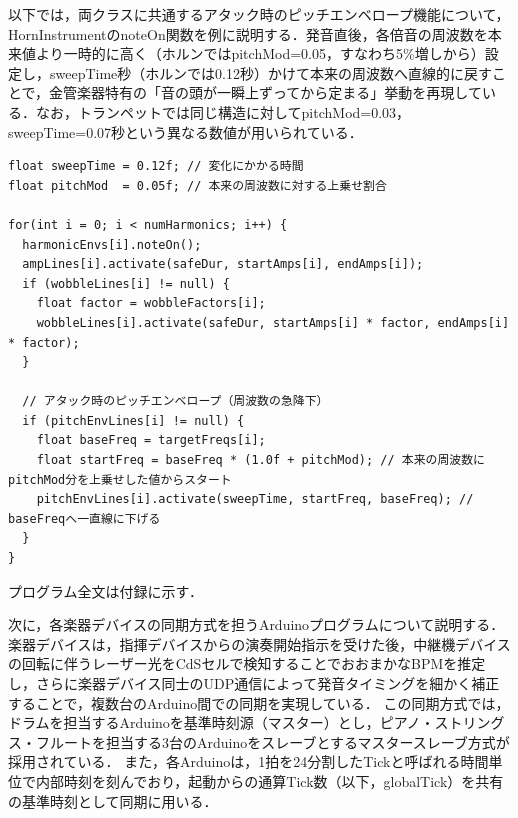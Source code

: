 以下では，両クラスに共通するアタック時のピッチエンベロープ機能について，HornInstrumentのnoteOn関数を例に説明する．発音直後，各倍音の周波数を本来値より一時的に高く（ホルンではpitchMod=0.05，すなわち5\%増しから）設定し，sweepTime秒（ホルンでは0.12秒）かけて本来の周波数へ直線的に戻すことで，金管楽器特有の「音の頭が一瞬上ずってから定まる」挙動を再現している．なお，トランペットでは同じ構造に対してpitchMod=0.03，sweepTime=0.07秒という異なる数値が用いられている．

\begin{lstlisting}[caption={HornInstrument::noteOn関数（ピッチエンベロープ部分）}, label={lst:gakki_horn_pitch}]
float sweepTime = 0.12f; // 変化にかかる時間
float pitchMod  = 0.05f; // 本来の周波数に対する上乗せ割合

for(int i = 0; i < numHarmonics; i++) {
  harmonicEnvs[i].noteOn();
  ampLines[i].activate(safeDur, startAmps[i], endAmps[i]);
  if (wobbleLines[i] != null) {
    float factor = wobbleFactors[i];
    wobbleLines[i].activate(safeDur, startAmps[i] * factor, endAmps[i] * factor);
  }

  // アタック時のピッチエンベロープ（周波数の急降下）
  if (pitchEnvLines[i] != null) {
    float baseFreq = targetFreqs[i];
    float startFreq = baseFreq * (1.0f + pitchMod); // 本来の周波数にpitchMod分を上乗せした値からスタート
    pitchEnvLines[i].activate(sweepTime, startFreq, baseFreq); // baseFreqへ一直線に下げる
  }
}
\end{lstlisting}

プログラム全文は付録に示す．

\fi


次に，各楽器デバイスの同期方式を担うArduinoプログラムについて説明する．楽器デバイスは，指揮デバイスからの演奏開始指示を受けた後，中継機デバイスの回転に伴うレーザー光をCdSセルで検知することでおおまかなBPMを推定し，さらに楽器デバイス同士のUDP通信によって発音タイミングを細かく補正することで，複数台のArduino間での同期を実現している．
この同期方式では，ドラムを担当するArduinoを基準時刻源（マスター）とし，ピアノ・ストリングス・フルートを担当する3台のArduinoをスレーブとするマスタースレーブ方式が採用されている．
また，各Arduinoは，1拍を24分割したTickと呼ばれる時間単位で内部時刻を刻んでおり，起動からの通算Tick数（以下，globalTick）を共有の基準時刻として同期に用いる．

